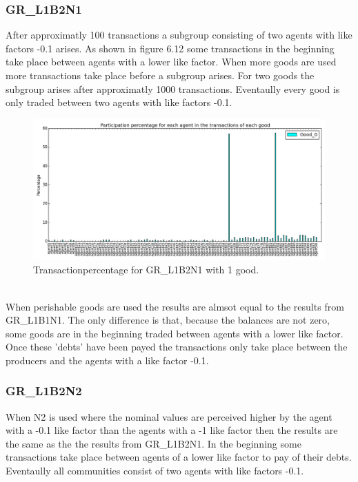 \documentclass[twoside,openright]{uva-bachelor-thesis}
\begin{document}
\subsubsection{GR\_L1B2N1}
After approximatly 100 transactions a subgroup consisting of two agents with like factors -0.1 arises. As shown in figure 6.12 some transactions in the beginning take place between agents with a lower like factor. When more goods are used more transactions take place before a subgroup arises. For two goods the subgroup arises after approximatly 1000 transactions. Eventaully every good is only traded between two agents with like factors -0.1. \\
\begin{figure}[h!]
  \centering
\includegraphics[scale=0.4]{Simulation_figures/GR_L1B2N1/1good_100transactions}
  \caption{Transactionpercentage for GR\_L1B2N1 with 1 good.}
\end{figure}
\\
When perishable goods are used the results are almsot equal to the results from GR\_L1B1N1. The only difference is that, because the balances are not zero, some goods are in the beginning traded between agents with a lower like factor. Once these 'debts' have been payed the transactions only take place between the producers and the agents with a like factor -0.1.


\subsubsection{GR\_L1B2N2}
When N2 is used where the nominal values are perceived higher by the agent with a -0.1 like factor than the agents with a -1 like factor then the results are the same as the the results from GR\_L1B2N1. In the beginning some transactions take place between agents of a lower like factor to pay of their debts. Eventaully all communities consist of two agents with like factors -0.1. 
\end{document}
